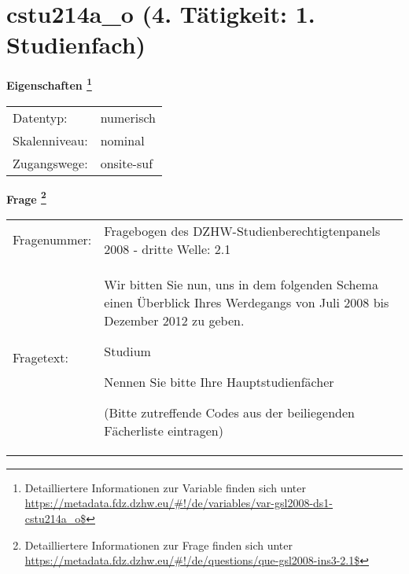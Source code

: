 
    \setcounter{footnote}{0}

    \vspace*{-1.8cm}
	\section{cstu214a\_o (4. Tätigkeit: 1. Studienfach)}
	\label{section:cstu214a_o}



    \vspace*{0.5cm}
    \noindent\textbf{Eigenschaften
	\footnote{Detailliertere Informationen zur Variable finden sich unter
		\url{https://metadata.fdz.dzhw.eu/\#!/de/variables/var-gsl2008-ds1-cstu214a_o$}}}\\
	\begin{tabularx}{\hsize}{@{}lX}
	Datentyp: & numerisch \\
	Skalenniveau: & nominal \\
	Zugangswege: &
	  onsite-suf
 \\
    \end{tabularx}



				\vspace*{0.5cm}
                \noindent\textbf{Frage
	                \footnote{Detailliertere Informationen zur Frage finden sich unter
		              \url{https://metadata.fdz.dzhw.eu/\#!/de/questions/que-gsl2008-ins3-2.1$}}}\\
				\begin{tabularx}{\hsize}{@{}lX}
					Fragenummer: &
					  Fragebogen des DZHW-Studienberechtigtenpanels 2008 - dritte Welle:
					  2.1
 \\
					Fragetext: & Wir bitten Sie nun, uns in dem folgenden Schema einen Überblick Ihres Werdegangs von Juli 2008 bis Dezember 2012 zu geben.\par  Studium\par  Nennen Sie bitte Ihre Hauptstudienfächer\par  (Bitte zutreffende Codes aus der beiliegenden Fächerliste eintragen) \\
				\end{tabularx}





